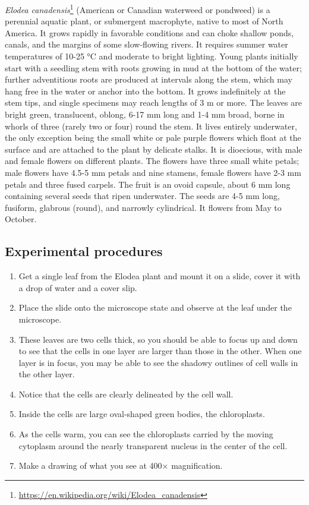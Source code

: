 \documentclass[]{book}
\providecommand{\tightlist}{%
  \setlength{\itemsep}{0pt}\setlength{\parskip}{0pt}}
\let\rmarkdownfootnote\footnote%
\def\footnote{\protect\rmarkdownfootnote}
\renewcommand{\href}[2]{#2\footnote{\url{#1}}}
\begin{document}
\href{https://en.wikipedia.org/wiki/Elodea_canadensis}{\emph{Elodea canadensis}} (American or Canadian waterweed or pondweed) is a perennial aquatic plant, or submergent macrophyte, native to most of North America. It grows rapidly in favorable conditions and can choke shallow ponds, canals, and the margins of some slow-flowing rivers. It requires summer water temperatures of 10-25 °C and moderate to bright lighting.
Young plants initially start with a seedling stem with roots growing in mud at the bottom of the water; further adventitious roots are produced at intervals along the stem, which may hang free in the water or anchor into the bottom. It grows indefinitely at the stem tips, and single specimens may reach lengths of 3 m or more.
The leaves are bright green, translucent, oblong, 6-17 mm long and 1-4 mm broad, borne in whorls of three (rarely two or four) round the stem. It lives entirely underwater, the only exception being the small white or pale purple flowers which float at the surface and are attached to the plant by delicate stalks.
It is dioecious, with male and female flowers on different plants. The flowers have three small white petals; male flowers have 4.5-5 mm petals and nine stamens, female flowers have 2-3 mm petals and three fused carpels. The fruit is an ovoid capsule, about 6 mm long containing several seeds that ripen underwater. The seeds are 4-5 mm long, fusiform, glabrous (round), and narrowly cylindrical. It flowers from May to October.

\hypertarget{experimental-procedures}{%
\subsection{Experimental procedures}\label{experimental-procedures}}

\begin{enumerate}
\def\labelenumi{\arabic{enumi}.}
\tightlist
\item
  Get a single leaf from the Elodea plant and mount it on a slide, cover it with a drop of water and a cover slip.
\item
  Place the slide onto the microscope state and observe at the leaf under the microscope.
\item
  These leaves are two cells thick, so you should be able to focus up and down to see that the cells in one layer are larger than those in the other. When one layer is in focus, you may be able to see the shadowy outlines of cell walls in the other layer.
\item
  Notice that the cells are clearly delineated by the cell wall.
\item
  Inside the cells are large oval-shaped green bodies, the chloroplasts.
\item
  As the cells warm, you can see the chloroplasts carried by the moving cytoplasm around the nearly transparent nucleus in the center of the cell.
\item
  Make a drawing of what you see at 400× magnification.
\end{enumerate}
\end{document}
